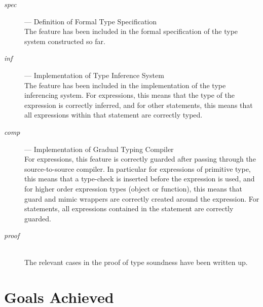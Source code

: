 \documentclass{article}
\begin{document}
	\begin{description}
		\item[\textit{spec}] --- Definition of Formal Type Specification \hfill \\

			The feature has been included in the formal specification of the
			type system constructed so far.
		
		\item[\textit{inf}] --- Implementation of Type Inference System \hfill \\

			The feature has been included in the implementation of the type
			inferencing system. For expressions, this means that the type of
			the expression is correctly inferred, and for other statements,
			this means that all expressions within that statement are
			correctly typed.
		
		\item[\textit{comp}] --- Implementation of Gradual Typing Compiler \hfill \\
			
			For expressions, this feature is correctly guarded after passing
			through the source-to-source compiler. In particular for
			expressions of primitive type, this means that a type-check is
			inserted before the expression is used, and for higher order
			expression types (object or function), this means that guard and
			mimic wrappers are correctly created around the expression. For
			statements, all expressions contained in the statement are
			correctly guarded.
		
		\item[\textit{proof}] \hfill \\
		
			The relevant cases in the proof of type soundness have been written
			up.

	\end{description}

	\section{Goals Achieved}
\end{document}
